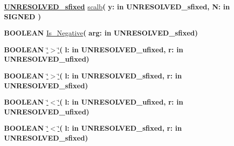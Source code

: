 \begin{DoxyCompactItemize}
\item 
{\bfseries {\bfseries {\bfseries \hyperlink{classfixed__pkg_aa723b28a027c3c0f9bca02d75e8df4d6}{U\+N\+R\+E\+S\+O\+L\+V\+E\+D\+\_\+sfixed}} \textcolor{vhdlchar}{ }}} \hyperlink{classfixed__pkg_a3b0a3ce1dfacad6ea0446802d2f6aad7}{scalb}{\bfseries  ( }{\bfseries \textcolor{vhdlchar}{y\+: }\textcolor{stringliteral}{in }\textcolor{vhdlchar}{U\+N\+R\+E\+S\+O\+L\+V\+E\+D\+\_\+sfixed}}{\bfseries  , \textcolor{vhdlchar}{N\+: }\textcolor{stringliteral}{in }{\bfseries \textcolor{comment}{S\+I\+G\+N\+E\+D}\textcolor{vhdlchar}{ }}}{\bfseries  )} 
\item 
{\bfseries {\bfseries \textcolor{comment}{B\+O\+O\+L\+E\+A\+N}\textcolor{vhdlchar}{ }}} \hyperlink{classfixed__pkg_ad2d7b0b5140709f3c6df16e8e32acaa9}{Is\+\_\+\+Negative}{\bfseries  ( }{\bfseries \textcolor{vhdlchar}{arg\+: }\textcolor{stringliteral}{in }\textcolor{vhdlchar}{U\+N\+R\+E\+S\+O\+L\+V\+E\+D\+\_\+sfixed}}{\bfseries  )} 
\item 
{\bfseries {\bfseries \textcolor{comment}{B\+O\+O\+L\+E\+A\+N}\textcolor{vhdlchar}{ }}} \hyperlink{classfixed__pkg_a3f54aa011a999eaf960a459e00088995}{\char`\"{}$>$\char`\"{}}{\bfseries  ( }{\bfseries \textcolor{vhdlchar}{l\+: }\textcolor{stringliteral}{in }\textcolor{vhdlchar}{U\+N\+R\+E\+S\+O\+L\+V\+E\+D\+\_\+ufixed}}{\bfseries  , \textcolor{vhdlchar}{r\+: }\textcolor{stringliteral}{in }\textcolor{vhdlchar}{U\+N\+R\+E\+S\+O\+L\+V\+E\+D\+\_\+ufixed}}{\bfseries  )} 
\item 
{\bfseries {\bfseries \textcolor{comment}{B\+O\+O\+L\+E\+A\+N}\textcolor{vhdlchar}{ }}} \hyperlink{classfixed__pkg_a3f54aa011a999eaf960a459e00088995}{\char`\"{}$>$\char`\"{}}{\bfseries  ( }{\bfseries \textcolor{vhdlchar}{l\+: }\textcolor{stringliteral}{in }\textcolor{vhdlchar}{U\+N\+R\+E\+S\+O\+L\+V\+E\+D\+\_\+sfixed}}{\bfseries  , \textcolor{vhdlchar}{r\+: }\textcolor{stringliteral}{in }\textcolor{vhdlchar}{U\+N\+R\+E\+S\+O\+L\+V\+E\+D\+\_\+sfixed}}{\bfseries  )} 
\item 
{\bfseries {\bfseries \textcolor{comment}{B\+O\+O\+L\+E\+A\+N}\textcolor{vhdlchar}{ }}} \hyperlink{classfixed__pkg_a5ad3a07264d5124001ca2ebc7d7257b3}{\char`\"{}$<$\char`\"{}}{\bfseries  ( }{\bfseries \textcolor{vhdlchar}{l\+: }\textcolor{stringliteral}{in }\textcolor{vhdlchar}{U\+N\+R\+E\+S\+O\+L\+V\+E\+D\+\_\+ufixed}}{\bfseries  , \textcolor{vhdlchar}{r\+: }\textcolor{stringliteral}{in }\textcolor{vhdlchar}{U\+N\+R\+E\+S\+O\+L\+V\+E\+D\+\_\+ufixed}}{\bfseries  )} 
\item 
{\bfseries {\bfseries \textcolor{comment}{B\+O\+O\+L\+E\+A\+N}\textcolor{vhdlchar}{ }}} \hyperlink{classfixed__pkg_a5ad3a07264d5124001ca2ebc7d7257b3}{\char`\"{}$<$\char`\"{}}{\bfseries  ( }{\bfseries \textcolor{vhdlchar}{l\+: }\textcolor{stringliteral}{in }\textcolor{vhdlchar}{U\+N\+R\+E\+S\+O\+L\+V\+E\+D\+\_\+sfixed}}{\bfseries  , \textcolor{vhdlchar}{r\+: }\textcolor{stringliteral}{in }\textcolor{vhdlchar}{U\+N\+R\+E\+S\+O\+L\+V\+E\+D\+\_\+sfixed}}{\bfseries  )} 

\end{DoxyCompactItemize}
